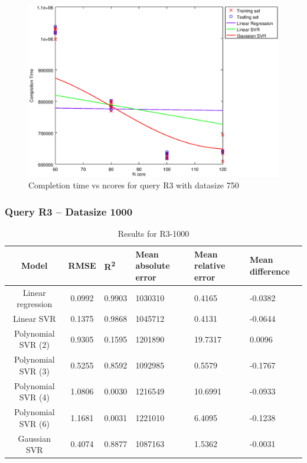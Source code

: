 \documentclass[a4paper,11pt]{article}
\begin{document}
\begin {figure}[hbtp]
\centering
\includegraphics[width=\textwidth]{output/R3_750_LINEAR_NCORE/plot_R3_750_bestmodels.eps}
\caption{Completion time vs ncores for query R3 with datasize 750}
\label{fig:all_linear_R3_750}
\end {figure}

\newpage
\subsubsection{Query R3 -- Datasize 1000}
\begin{table}[H]
	\centering
	\begin{adjustbox}{center}
		\begin{tabular}{c | c M{1.2cm} M{2.5cm} M{2.5cm} M{1.8cm}}
			Model & RMSE & R\textsuperscript{2} & Mean absolute error & Mean relative error & Mean difference \tabularnewline
			\hline
			Linear regression & 0.0992 & 0.9903 & 1030310 & 0.4165 & -0.0382 \\
			Linear SVR & 0.1375 & 0.9868 & 1045712 & 0.4131 & -0.0644 \\
			Polynomial SVR (2) & 0.9305 & 0.1595 & 1201890 & 19.7317 & 0.0096 \\
			Polynomial SVR (3) & 0.5255 & 0.8592 & 1092985 & 0.5579 & -0.1767 \\
			Polynomial SVR (4) & 1.0806 & 0.0030 & 1216549 & 10.6991 & -0.0933 \\
			Polynomial SVR (6) & 1.1681 & 0.0031 & 1221010 & 6.4095 & -0.1238 \\
			Gaussian SVR & 0.4074 & 0.8877 & 1087163 & 1.5362 & -0.0031 \\
		\end{tabular}
	\end{adjustbox}
	\\
	\caption{Results for R3-1000}
	\label{fig:all_linear_R3_1000}
\end{table}
\end{document}
